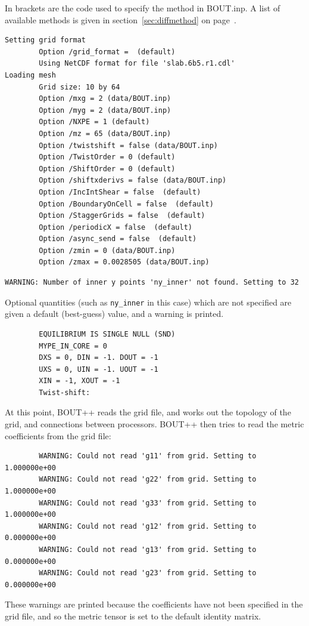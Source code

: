 \documentclass[12pt]{article}
\newcommand{\code}[1]{\texttt{#1}}
\begin{document}
In brackets are the code used to specify the method in BOUT.inp. A list of
available methods is given in section~\ref{sec:diffmethod} on
page~\pageref{sec:diffmethod}.

%
\begin{verbatim}
Setting grid format
        Option /grid_format =  (default)
        Using NetCDF format for file 'slab.6b5.r1.cdl'
Loading mesh
        Grid size: 10 by 64
        Option /mxg = 2 (data/BOUT.inp)
        Option /myg = 2 (data/BOUT.inp)
        Option /NXPE = 1 (default)
        Option /mz = 65 (data/BOUT.inp)
        Option /twistshift = false (data/BOUT.inp)
        Option /TwistOrder = 0 (default)
        Option /ShiftOrder = 0 (default)
        Option /shiftxderivs = false (data/BOUT.inp)
        Option /IncIntShear = false  (default)
        Option /BoundaryOnCell = false  (default)
        Option /StaggerGrids = false  (default)
        Option /periodicX = false  (default)
        Option /async_send = false  (default)
        Option /zmin = 0 (data/BOUT.inp)
        Option /zmax = 0.0028505 (data/BOUT.inp)
\end{verbatim}
%
\begin{verbatim}
WARNING: Number of inner y points 'ny_inner' not found. Setting to 32
\end{verbatim}
%
Optional quantities (such as \code{ny\_inner} in this case) which are not
specified are given a default (best-guess) value, and a warning is printed.
%
\begin{verbatim}
        EQUILIBRIUM IS SINGLE NULL (SND)
        MYPE_IN_CORE = 0
        DXS = 0, DIN = -1. DOUT = -1
        UXS = 0, UIN = -1. UOUT = -1
        XIN = -1, XOUT = -1
        Twist-shift:
\end{verbatim}
%
At this point, BOUT++ reads the grid file, and works out the topology of the
grid, and connections between processors.  BOUT++ then tries to read the metric
coefficients from the grid file:
%
\begin{verbatim}
        WARNING: Could not read 'g11' from grid. Setting to 1.000000e+00
        WARNING: Could not read 'g22' from grid. Setting to 1.000000e+00
        WARNING: Could not read 'g33' from grid. Setting to 1.000000e+00
        WARNING: Could not read 'g12' from grid. Setting to 0.000000e+00
        WARNING: Could not read 'g13' from grid. Setting to 0.000000e+00
        WARNING: Could not read 'g23' from grid. Setting to 0.000000e+00
\end{verbatim}
%
These warnings are printed because the coefficients have not been specified in
the grid file, and so the metric tensor is set to the default identity matrix.
\end{document}
